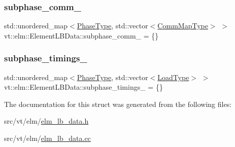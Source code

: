 \mbox{\label{structvt_1_1elm_1_1_element_l_b_data_a3f4708b0c2d8af6627ee6df925b95890}} 
\subsubsection{\texorpdfstring{subphase\+\_\+comm\+\_\+}{subphase\_comm\_}}
{\footnotesize\ttfamily std\+::unordered\+\_\+map$<$\hyperlink{namespacevt_a46ce6733d5cdbd735d561b7b4029f6d7}{Phase\+Type}, std\+::vector$<$\hyperlink{namespacevt_1_1elm_a38487cb8896b9b4763efa9022fab560e}{Comm\+Map\+Type}$>$ $>$ vt\+::elm\+::\+Element\+L\+B\+Data\+::subphase\+\_\+comm\+\_\+ = \{\}\hspace{0.3cm}{\ttfamily [protected]}}

\mbox{\label{structvt_1_1elm_1_1_element_l_b_data_a4307d2e80d236ad36f8d161febcb239a}} 
\subsubsection{\texorpdfstring{subphase\+\_\+timings\+\_\+}{subphase\_timings\_}}
{\footnotesize\ttfamily std\+::unordered\+\_\+map$<$\hyperlink{namespacevt_a46ce6733d5cdbd735d561b7b4029f6d7}{Phase\+Type}, std\+::vector$<$\hyperlink{namespacevt_a8fb51741340b87d7aaee0bef60e9896b}{Load\+Type}$>$ $>$ vt\+::elm\+::\+Element\+L\+B\+Data\+::subphase\+\_\+timings\+\_\+ = \{\}\hspace{0.3cm}{\ttfamily [protected]}}



The documentation for this struct was generated from the following files\+:\begin{DoxyCompactItemize}
\item 
src/vt/elm/\hyperlink{elm__lb__data_8h}{elm\+\_\+lb\+\_\+data.\+h}\item 
src/vt/elm/\hyperlink{elm__lb__data_8cc}{elm\+\_\+lb\+\_\+data.\+cc}\end{DoxyCompactItemize}
